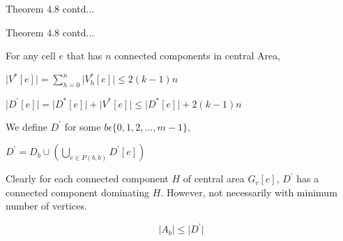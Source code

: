 \documentclass{beamer}
\begin{document}
\begin{frame}{Theorem 4.8 contd...}



\end{frame}

\begin{frame}{Theorem 4.8 contd...}




\begin{exampleblock}{}

    For any cell $e$ that has $n$ connected components in central Area,

    \vspace{0.5em}
    
    $\lvert V^*[e] \rvert = \displaystyle \sum_{h=0}^{n} \lvert V^*_h[e] \rvert \le 2(k -1) n$ 

    \vspace{0.5em}

    $\lvert D^\prime[e] \rvert = \lvert D^*[e] \rvert + \lvert V^*[e] \rvert \le \lvert D^*[e] \rvert + 2(k -1) n$ 

    \vspace{1em}

    We define $D^\prime$ for some $b \epsilon \{0,1,2,..., m -1\} ,$

    \vspace{0.5em}

    $D^\prime = D_b \cup \left( \bigcup\limits_{e \in P(b,b)} D^\prime[e] \right)$

    \vspace{0.5em}

   Clearly for each connected component $H$ of central area $G_c[e]$, $D^\prime$ has a connected component dominating $H$. However, not necessarily with minimum number of vertices. 

    \begin{equation}    
          \lvert A_b \rvert \le \lvert D^\prime \rvert           
    \end{equation}
    

\end{exampleblock}

\end{frame}

\addtocounter{framenumber}{3}


% 

\end{document}
